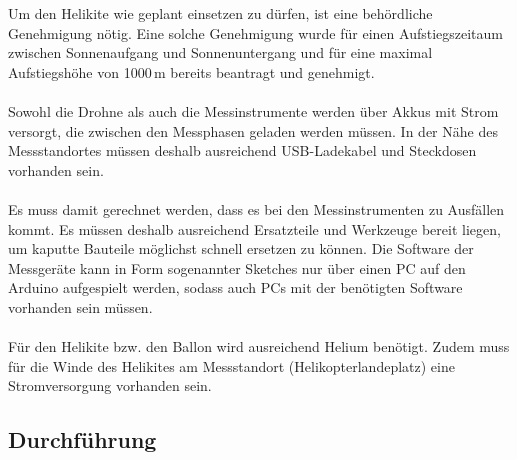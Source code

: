 \documentclass[a4paper,11pt,DIV=calc,tablecaptionabove,headinclude,twoside]{article}
\begin{document}
Um den Helikite wie geplant einsetzen zu dürfen, ist eine behördliche Genehmigung nötig. Eine solche Genehmigung wurde für einen Aufstiegszeitaum zwischen Sonnenaufgang und Sonnenuntergang und für eine maximal Aufstiegshöhe von 1000\,m bereits beantragt und genehmigt.\\\\
Sowohl die Drohne als auch die Messinstrumente werden über Akkus mit Strom versorgt, die zwischen den Messphasen geladen werden müssen. In der Nähe des Messstandortes müssen deshalb ausreichend USB-Ladekabel und Steckdosen vorhanden sein.\\\\
Es muss damit gerechnet werden, dass es bei den Messinstrumenten zu Ausfällen kommt. Es müssen deshalb ausreichend Ersatzteile und Werkzeuge bereit liegen, um kaputte Bauteile möglichst schnell ersetzen zu können. Die Software der Messgeräte kann in Form sogenannter Sketches nur über einen PC auf den Arduino aufgespielt werden, sodass auch PCs mit der benötigten Software vorhanden sein müssen.\\\\
Für den Helikite bzw. den Ballon wird ausreichend Helium benötigt. Zudem muss für die Winde des Helikites am Messstandort (Helikopterlandeplatz) eine Stromversorgung vorhanden sein.

\subsection{Durchführung}
\label{sec:Durchfuehrung}
\end{document}
